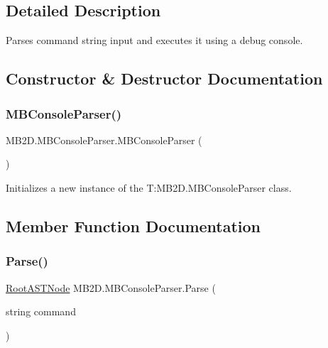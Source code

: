 \subsection{Detailed Description}
Parses command string input and executes it using a debug console. 



\subsection{Constructor \& Destructor Documentation}
\hypertarget{class_m_b2_d_1_1_m_b_console_parser_ad14d20f3d88fade887577eb105837008}{}\label{class_m_b2_d_1_1_m_b_console_parser_ad14d20f3d88fade887577eb105837008} 
\subsubsection{\texorpdfstring{M\+B\+Console\+Parser()}{MBConsoleParser()}}
{\footnotesize\ttfamily M\+B2\+D.\+M\+B\+Console\+Parser.\+M\+B\+Console\+Parser (\begin{DoxyParamCaption}{ }\end{DoxyParamCaption})\hspace{0.3cm}{\ttfamily [inline]}}



Initializes a new instance of the T\+:\+M\+B2\+D.\+M\+B\+Console\+Parser class. 



\subsection{Member Function Documentation}
\hypertarget{class_m_b2_d_1_1_m_b_console_parser_a880d5a9c56db05d19610df482b15bbf0}{}\label{class_m_b2_d_1_1_m_b_console_parser_a880d5a9c56db05d19610df482b15bbf0} 
\subsubsection{\texorpdfstring{Parse()}{Parse()}}
{\footnotesize\ttfamily \hyperlink{class_m_b2_d_1_1_root_a_s_t_node}{Root\+A\+S\+T\+Node} M\+B2\+D.\+M\+B\+Console\+Parser.\+Parse (\begin{DoxyParamCaption}\item[{string}]{command }\end{DoxyParamCaption})\hspace{0.3cm}{\ttfamily [inline]}}



